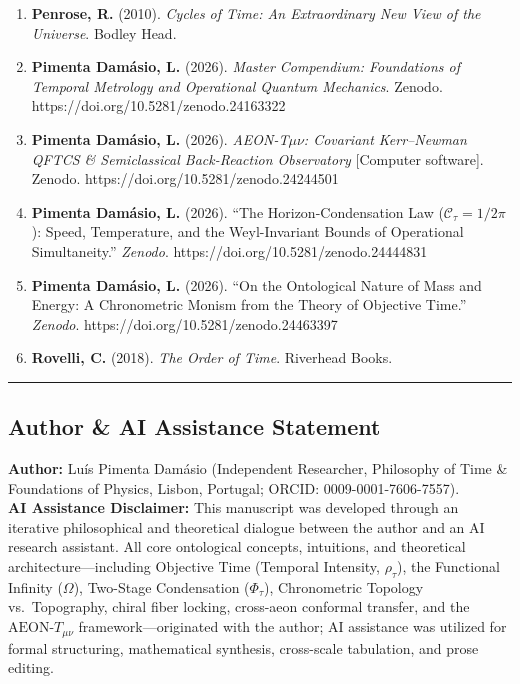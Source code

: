 \documentclass[
]{article}
\begin{document}
\begin{enumerate}
  \textbf{Maudlin, T.} (2012). \emph{Philosophy of Physics: Space and
  Time}. Princeton University Press.
\item
  \textbf{Penrose, R.} (2010). \emph{Cycles of Time: An Extraordinary
  New View of the Universe}. Bodley Head.
\item
  \textbf{Pimenta Damásio, L.} (2026). \emph{Master Compendium:
  Foundations of Temporal Metrology and Operational Quantum Mechanics}.
  Zenodo. https://doi.org/10.5281/zenodo.24163322
\item
  \textbf{Pimenta Damásio, L.} (2026). \emph{AEON-T\(\mu\nu\): Covariant
  Kerr--Newman QFTCS \& Semiclassical Back-Reaction Observatory}
  {[}Computer software{]}. Zenodo.
  https://doi.org/10.5281/zenodo.24244501
\item
  \textbf{Pimenta Damásio, L.} (2026). ``The Horizon-Condensation Law
  (\(\mathcal{C}_\tau = 1/2\pi\)): Speed, Temperature, and the
  Weyl-Invariant Bounds of Operational Simultaneity.'' \emph{Zenodo}.
  https://doi.org/10.5281/zenodo.24444831
\item
  \textbf{Pimenta Damásio, L.} (2026). ``On the Ontological Nature of
  Mass and Energy: A Chronometric Monism from the Theory of Objective
  Time.'' \emph{Zenodo}. https://doi.org/10.5281/zenodo.24463397
\item
  \textbf{Rovelli, C.} (2018). \emph{The Order of Time}. Riverhead
  Books.
\end{enumerate}

\begin{center}\rule{0.5\linewidth}{0.5pt}\end{center}

\subsection{Author \& AI Assistance
Statement}\label{author-ai-assistance-statement}

\textbf{Author:} Luís Pimenta Damásio (Independent Researcher,
Philosophy of Time \& Foundations of Physics, Lisbon, Portugal; ORCID:
0009-0001-7606-7557).\\
\textbf{AI Assistance Disclaimer:} This manuscript was developed through
an iterative philosophical and theoretical dialogue between the author
and an AI research assistant. All core ontological concepts, intuitions,
and theoretical architecture---including Objective Time (Temporal
Intensity, \(\rho_\tau\)), the Functional Infinity (\(\Omega\)),
Two-Stage Condensation (\(\Phi_\tau\)), Chronometric Topology
vs.~Topography, chiral fiber locking, cross-aeon conformal transfer, and
the \(\text{AEON-}T_{\mu\nu}\) framework---originated with the author;
AI assistance was utilized for formal structuring, mathematical
synthesis, cross-scale tabulation, and prose editing.
\end{document}
